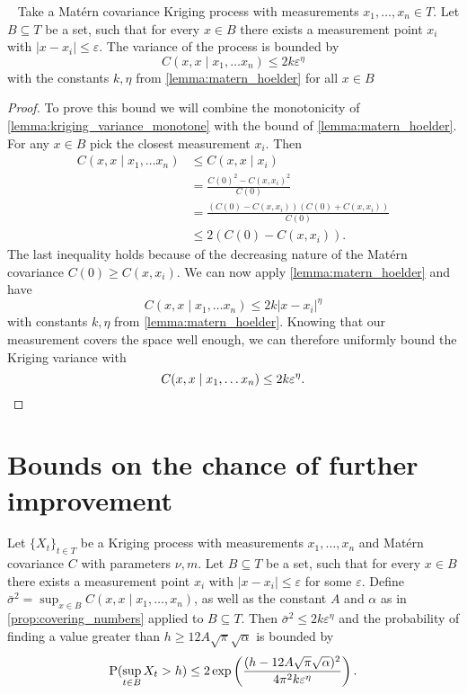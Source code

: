 \begin{lemma}
    ~\label{lemma:bounding_variance}
    Take a Matérn covariance Kriging process with measurements $x_{1}, \dots, x_{n} \in T$.
    Let $B \subseteq T$ be a set, such that for every $x \in B$ there exists a measurement point $x_{i}$ with $\lvert x-x_{i} \rvert \leq \varepsilon$.
    The variance of the process is bounded by  
    \[
    C(x,x \mid x_{1}, \dots x_{n}) \leq 2k \varepsilon^{\eta} 
    \] 
    with the constants $k, \eta$ from \cref{lemma:matern_hoelder} for all $x \in B$
\end{lemma}
\begin{proof}
To prove this bound we will combine the monotonicity of \cref{lemma:kriging_variance_monotone} with the bound of \cref{lemma:matern_hoelder}.
For any $x \in B$ pick the closest measurement $x_{i}$. Then
\begin{align*}
    C(x,x \mid x_{1}, \dots x_{n}) &\leq C(x,x \mid x_{i})\\
    &= \frac{C(0)^2-C(x,x_{i})^2}{C(0)}\\
    &= \frac{(C(0)-C(x,x_{i}))(C(0)+C(x,x_{i}))}{C(0)}\\
    &\leq 2 (C(0) - C(x,x_{i})).
\end{align*}
The last inequality holds because of the decreasing nature of the Matérn covariance $C(0)\geq C(x,x_{i})$.
We can now apply \cref{lemma:matern_hoelder} and have
\[
    C(x,x \mid x_{1}, \dots x_{n}) \leq 2k \lvert x-x_{i} \rvert^{\eta}
\]
with constants $k, \eta$ from \cref{lemma:matern_hoelder}.
Knowing that our measurement covers the space well enough, we can therefore uniformly bound the Kriging variance with
\[
    C(x,x \mid x_{1}, \dots x_{n}) \leq 2k \varepsilon^{\eta}. \qedhere
\]
\end{proof}



\section{Bounds on the chance of further improvement}



\begin{theorem}
Let $ \{ X_{t} \}_{t \in T}$ be a Kriging process with measurements $x_{1}, \dots, x_{n}$  and Matérn covariance $C$ with parameters $\nu,m$.
Let $B \subseteq T$ be a set, such that for every $x \in B$ there exists a measurement point $x_{i}$ with $\lvert x-x_{i} \rvert \leq \varepsilon$ for some $\varepsilon$.
Define $\bar{\sigma}^2= \sup_{x \in B} C(x,x \mid x_{1}, \dots, x_{n})$, as well as the constant $A$ and $\alpha$ as in \cref{prop:covering_numbers} applied to $B \subseteq T$.
Then $\bar{\sigma}^2 \leq 2k \varepsilon^{\eta}$ and
the probability of finding a value greater than $h \geq 12 A \sqrt{\pi} \sqrt{\alpha}$ is bounded by
\[
    \mathrm{P}(\sup_{t \in B} X_{t} > h) \leq 2 \exp\left( \frac{(h-12 A \sqrt{\pi} \sqrt{\alpha})^2}{4\pi^2 k \varepsilon^{\eta}} \right).
\]
\end{theorem}

